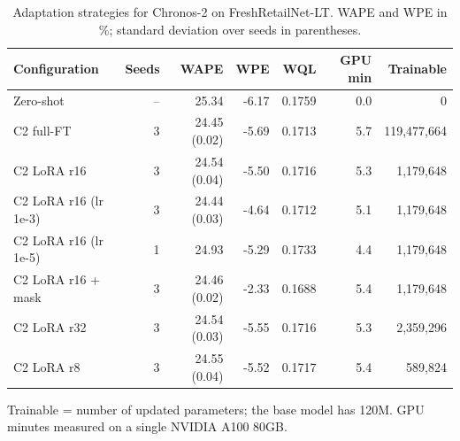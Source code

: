 \begin{table}[t]
\centering
\small
\caption{Adaptation strategies for Chronos-2 on FreshRetailNet-LT. WAPE and WPE in \%; standard deviation over seeds in parentheses.}
\label{tab:table5_adaptation}
\begin{tabular}{lrrrrrr}
\toprule
Configuration & Seeds & WAPE & WPE & WQL & GPU min & Trainable \\
\midrule
Zero-shot & -- & 25.34 & -6.17 & 0.1759 & 0.0 & 0 \\
C2 full-FT & 3 & 24.45 (0.02) & -5.69 & 0.1713 & 5.7 & 119,477,664 \\
C2 LoRA r16 & 3 & 24.54 (0.04) & -5.50 & 0.1716 & 5.3 & 1,179,648 \\
C2 LoRA r16 (lr 1e-3) & 3 & 24.44 (0.03) & -4.64 & 0.1712 & 5.1 & 1,179,648 \\
C2 LoRA r16 (lr 1e-5) & 1 & 24.93 & -5.29 & 0.1733 & 4.4 & 1,179,648 \\
C2 LoRA r16 + mask & 3 & 24.46 (0.02) & -2.33 & 0.1688 & 5.4 & 1,179,648 \\
C2 LoRA r32 & 3 & 24.54 (0.03) & -5.55 & 0.1716 & 5.3 & 2,359,296 \\
C2 LoRA r8 & 3 & 24.55 (0.04) & -5.52 & 0.1717 & 5.4 & 589,824 \\
\bottomrule
\end{tabular}
\begin{tablenotes}\footnotesize
\item Trainable = number of updated parameters; the base model has 120M. GPU minutes measured on a single NVIDIA A100 80GB.
\end{tablenotes}
\end{table}
